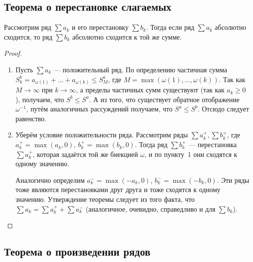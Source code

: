\subsection{Теорема о перестановке слагаемых}

\begin{theorem} \hypertarget{теорема о перестановке слагаемых}{}
	Рассмотрим ряд \(\sum a_k\) и его перестановку \(\sum b_k\). Тогда если ряд \(\sum a_k\) абсолютно сходится, то ряд \(\sum b_k\) абсолютно сходится к той же сумме.
\end{theorem}
\begin{proof}
	\begin{enumerate}
		\item Пусть \(\sum a_k\) --- положительный ряд. По определению частичная сумма \(S_k^b = a_{\omega(1)} + \ldots + a_{\omega(k)} \leqslant S_M^a\), где \(M = \max (\omega(1), \ldots, \omega(k))\). Так как \(M \to \infty\) при \(k \to \infty\), а пределы частичных сумм существуют (так как \(a_k \geqslant 0\)), получаем, что \(S^b \leqslant S^a\). А из того, что существует обратное отображение \(\omega^{-1}\), путём аналогичных рассуждений получаем, что \(S^a \leqslant S^b\). Отсюдо следует равенство.
		\item Уберём условие положительности ряда. Рассмотрим ряды \(\sum a_k^+, \sum b_k^+\), где \(a_k^+ = \max (a_k, 0)\), \(b_k^+ = \max (b_k, 0)\). Тогда ряд \(\sum b_k^+\) --- перестановка \(\sum a_k^+\), которая задаётся той же биекцией \(\omega\), и по пункту~1 они сходятся к одному значению. 
		
		Аналогично определим \(a_k^- = \max (-a_k, 0)\), \(b_k^- = \max (-b_k, 0)\). Эти ряды тоже являются перестановками друг друга и тоже сходятся к одному значению. Утверждение теоремы следует из того факта, что \(\sum a_k = \sum a_k^+ +\sum a_k^-\) (аналогичное, очевидно, справедливо и для \(\sum b_k\)).
	\end{enumerate}
\end{proof}

\subsection{Теорема о произведении рядов}

